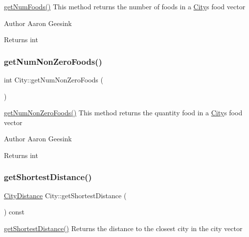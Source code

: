 \mbox{\hyperlink{class_city_a1462a90a0d40e0d946903b1db214da0e}{get\+Num\+Foods()}} This method returns the number of foods in a \mbox{\hyperlink{class_city}{City}}\textquotesingle{}s food vector 

\begin{DoxyAuthor}{Author}
Aaron Geesink 
\end{DoxyAuthor}
\begin{DoxyReturn}{Returns}
int 
\end{DoxyReturn}
\mbox{\label{class_city_adc2840394de55c7fa19a0411d7b7541d}} 
\subsubsection{\texorpdfstring{getNumNonZeroFoods()}{getNumNonZeroFoods()}}
{\footnotesize\ttfamily int City\+::get\+Num\+Non\+Zero\+Foods (\begin{DoxyParamCaption}{ }\end{DoxyParamCaption})}



\mbox{\hyperlink{class_city_adc2840394de55c7fa19a0411d7b7541d}{get\+Num\+Non\+Zero\+Foods()}} This method returns the quantity food in a \mbox{\hyperlink{class_city}{City}}\textquotesingle{}s food vector 

\begin{DoxyAuthor}{Author}
Aaron Geesink 
\end{DoxyAuthor}
\begin{DoxyReturn}{Returns}
int 
\end{DoxyReturn}
\mbox{\label{class_city_ad577ecd4be83b37ef2f9c5ff547f5259}} 
\subsubsection{\texorpdfstring{getShortestDistance()}{getShortestDistance()}}
{\footnotesize\ttfamily \mbox{\hyperlink{struct_city_distance}{City\+Distance}} City\+::get\+Shortest\+Distance (\begin{DoxyParamCaption}{ }\end{DoxyParamCaption}) const}



\mbox{\hyperlink{class_city_ad577ecd4be83b37ef2f9c5ff547f5259}{get\+Shortest\+Distance()}} Returns the distance to the closest city in the city vector 

